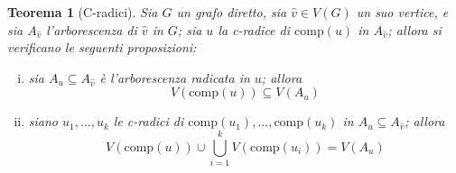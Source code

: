 \documentclass[14pt]{extreport}
\newtheorem{theorem}{Teorema}[subsection]
\theoremstyle{definition}
\theoremstyle{definition}
\begin{document}
\begin{theorem}[C-radici]
    Sia $G$ un grafo diretto, sia $\hat v \in V(G)$ un suo vertice, e sia $A_{\hat v}$ l'arborescenza di $\hat v$ in $G$; sia $u$ la c-radice di $\mathrm{comp}(u)$ in $A_{\hat v}$; allora si verificano le seguenti proposizioni:

    \begin{enumerate}[i)]
        \item sia $A_u \subseteq A_{\hat v}$ è l'arborescenza radicata in $u$; allora $$V(\mathrm{comp}(u)) \subseteq V(A_u)$$
        \item siano $u_1, \ldots, u_k$ le c-radici di $\mathrm{comp}(u_1), \ldots, \mathrm{comp}(u_k)$ in $A_u \subseteq A_{\hat v}$; allora $$V(\mathrm{comp}(u)) \cup \displaystyle \bigcup_{i = 1}^k {V(\mathrm{comp}(u_i))} = V(A_u)$$
    \end{enumerate}
\end{theorem}
\end{document}
